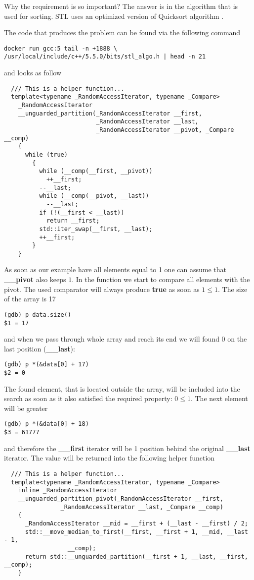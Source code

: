\documentclass[14pt,a4paper]{article}
\begin{document}
Why the requirement is so important? The answer is in the algorithm
that is used for sorting. STL uses an optimized version of Quicksort algorithm
\cite{wiki:quicksort}. 

The code that produces the problem can be found via the following command
\begin{verbatim}
docker run gcc:5 tail -n +1888 \
/usr/local/include/c++/5.5.0/bits/stl_algo.h | head -n 21
\end{verbatim}
and looks as follow
\begin{verbatim}
  /// This is a helper function...
  template<typename _RandomAccessIterator, typename _Compare>
    _RandomAccessIterator
    __unguarded_partition(_RandomAccessIterator __first,
                          _RandomAccessIterator __last,
                          _RandomAccessIterator __pivot, _Compare __comp)
    {
      while (true)
        {
          while (__comp(__first, __pivot))
            ++__first;
          --__last;
          while (__comp(__pivot, __last))
            --__last;
          if (!(__first < __last))
            return __first;
          std::iter_swap(__first, __last);
          ++__first;
        }
    }
\end{verbatim}
As soon as our example have all elements equal to 1 one can assume
that \textbf{\_\_pivot} also keeps $1$. In the function we start to
compare all elements with the pivot. The used comparator will always
produce \textbf{true} as soon 
as $1 \le 1$. The size of the array is 17 
\begin{verbatim}
(gdb) p data.size()
$1 = 17
\end{verbatim}
and when we pass through whole array and reach its end we
will found $0$ on the last position (\textbf{\_\_last}): 
\begin{verbatim}
(gdb) p *(&data[0] + 17)
$2 = 0
\end{verbatim}
The found element, that is located outside the array, will be
included into the search as soon as it also satisfied the required
property: $0 \le 1$. The next element will be greater  
\begin{verbatim}
(gdb) p *(&data[0] + 18)
$3 = 61777
\end{verbatim}
and therefore the \textbf{\_\_first} iterator will be 1 position
behind the original \textbf{\_\_last} iterator. The value will be
returned into the following helper function
\begin{verbatim}
  /// This is a helper function...
  template<typename _RandomAccessIterator, typename _Compare>
    inline _RandomAccessIterator
    __unguarded_partition_pivot(_RandomAccessIterator __first,
				_RandomAccessIterator __last, _Compare __comp)
    {
      _RandomAccessIterator __mid = __first + (__last - __first) / 2;
      std::__move_median_to_first(__first, __first + 1, __mid, __last - 1,
				  __comp);
      return std::__unguarded_partition(__first + 1, __last, __first, __comp);
    }
\end{verbatim}
\end{document}
